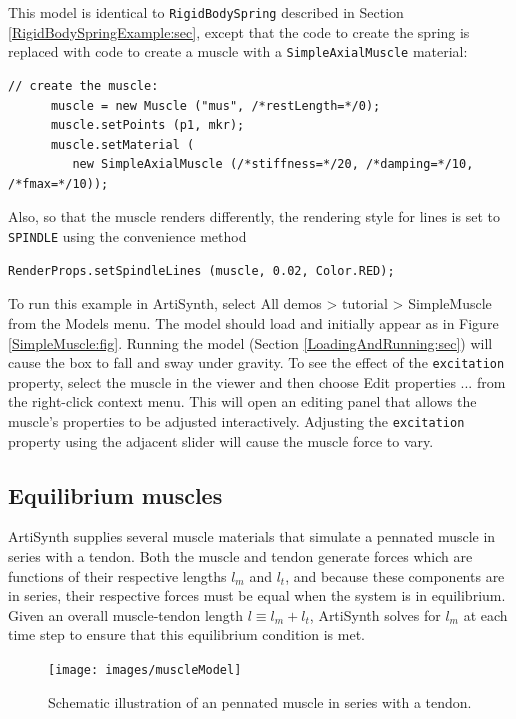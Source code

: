 This model is identical to {\tt RigidBodySpring} described in Section
\ref{RigidBodySpringExample:sec}, except that the code to create
the spring is replaced with code to create a muscle
with a {\tt SimpleAxialMuscle} material:
%
\begin{lstlisting}[]
      // create the muscle:      
      muscle = new Muscle ("mus", /*restLength=*/0);
      muscle.setPoints (p1, mkr);
      muscle.setMaterial (
         new SimpleAxialMuscle (/*stiffness=*/20, /*damping=*/10, /*fmax=*/10));
\end{lstlisting}
%
Also, so that the muscle renders differently, the rendering style
for lines is set to {\tt SPINDLE} using the convenience method
%
\begin{lstlisting}[]
      RenderProps.setSpindleLines (muscle, 0.02, Color.RED);
\end{lstlisting}
%

To run this example in ArtiSynth, select {\sf All demos > tutorial >
SimpleMuscle} from the {\sf Models} menu. The model should load and
initially appear as in Figure \ref{SimpleMuscle:fig}.  Running the
model (Section \ref{LoadingAndRunning:sec}) will cause the box to fall
and sway under gravity. To see the effect of the {\tt excitation}
property, select the muscle in the viewer and then choose {\sf Edit
properties ...} from the right-click context menu.  This will open an
editing panel that allows the muscle's properties to be adjusted
interactively. Adjusting the {\tt excitation} property using the
adjacent slider will cause the muscle force to vary.

\subsection{Equilibrium muscles}
\label{equilibriumMuscles:sec}

ArtiSynth supplies several muscle materials that simulate a pennated
muscle in series with a tendon. Both the muscle and tendon generate
forces which are functions of their respective lengths $l_m$ and
$l_t$, and because these components are in series, their respective
forces must be equal when the system is in equilibrium. Given an
overall muscle-tendon length $l \equiv l_m + l_t$, ArtiSynth solves
for $l_m$ at each time step to ensure that this equilibrium condition
is met.

\begin{figure}[h]
\begin{center}
 \texttt{[image: images/muscleModel]}
\end{center}
\caption{Schematic illustration of an pennated muscle in series with a
tendon.}
\label{equilibriumMuscles:fig}
\end{figure}

